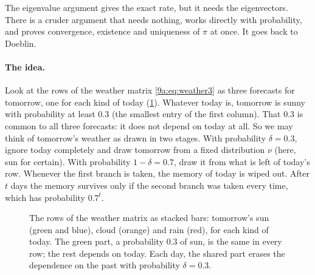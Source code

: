 The eigenvalue argument gives the exact rate, but it needs the eigenvectors. There is a cruder
argument that needs nothing, works directly with probability, and proves convergence,
existence and uniqueness of $\pi$ at once. It goes back to Doeblin.

\paragraph{The idea.} Look at the rows of the weather matrix \eqref{9a:eq:weather3} as three
forecasts for tomorrow, one for each kind of today (\cref{9a:fig:doeblin}). Whatever today is,
tomorrow is sunny with probability at least $0.3$ (the smallest entry of the first column). That
$0.3$ is common to all three forecasts: it does not depend on today at all. So we may think of
tomorrow's weather as drawn in two stages. With probability $\delta=0.3$, ignore today
completely and draw tomorrow from a fixed distribution $\nu$ (here, sun for certain). With
probability $1-\delta=0.7$, draw it from what is left of today's row. Whenever the first branch
is taken, the memory of today is wiped out. After $t$ days the memory survives only if the
second branch was taken every time, which has probability $0.7^t$.

\begin{figure}[htbp]
\centering
{}
\caption{The rows of the weather matrix as stacked bars: tomorrow's sun (green and blue),
cloud (orange) and rain (red), for each kind of today. The green part, a probability $0.3$ of
sun, is the same in every row; the rest depends on today. Each day, the shared part erases the
dependence on the past with probability $\delta=0.3$.}
\label{9a:fig:doeblin}
\end{figure}

